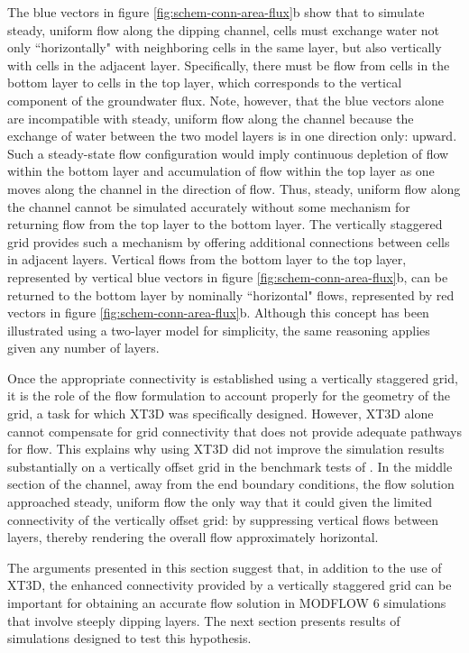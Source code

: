 \documentclass{article}
\begin{document}
The blue vectors in figure \ref{fig:schem-conn-area-flux}b show that to simulate steady, uniform flow along the dipping channel, cells must exchange water not only ``horizontally" with neighboring cells in the same layer, but also vertically with cells in the adjacent layer. Specifically, there must be flow from cells in the bottom layer to cells in the top layer, which corresponds to the vertical component of the groundwater flux. Note, however, that the blue vectors alone are incompatible with steady, uniform flow along the channel because the exchange of water between the two model layers is in one direction only: upward. Such a steady-state flow configuration would imply continuous depletion of flow within the bottom layer and accumulation of flow within the top layer as one moves along the channel in the direction of flow. Thus, steady, uniform flow along the channel cannot be simulated accurately without some mechanism for returning flow from the top layer to the bottom layer. The vertically staggered grid provides such a mechanism by offering additional connections between cells in adjacent layers. Vertical flows from the bottom layer to the top layer, represented by vertical blue vectors in figure \ref{fig:schem-conn-area-flux}b, can be returned to the bottom layer by nominally ``horizontal" flows, represented by red vectors in figure \ref{fig:schem-conn-area-flux}b. Although this concept has been illustrated using a two-layer model for simplicity, the same reasoning applies given any number of layers.

Once the appropriate connectivity is established using a vertically staggered grid, it is the role of the flow formulation to account properly for the geometry of the grid, a task for which XT3D was specifically designed. However, XT3D alone cannot compensate for grid connectivity that does not provide adequate pathways for flow. This explains why using XT3D did not improve the simulation results substantially on a vertically offset grid in the benchmark tests of \cite{bardot2022}.  In the middle section of the channel, away from the end boundary conditions, the flow solution approached steady, uniform flow the only way that it could given the limited connectivity of the vertically offset grid: by suppressing vertical flows between layers, thereby rendering the overall flow approximately horizontal.

The arguments presented in this section suggest that, in addition to the use of XT3D, the enhanced connectivity provided by a vertically staggered grid can be important for obtaining an accurate flow solution in MODFLOW 6 simulations that involve steeply dipping layers. The next section presents results of simulations designed to test this hypothesis.
\end{document}
